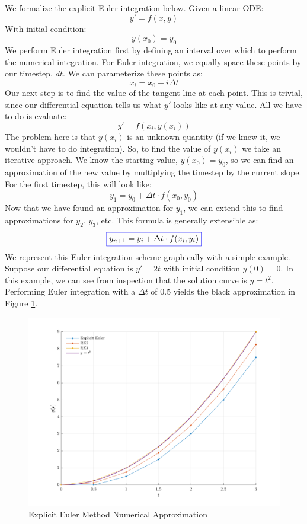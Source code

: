 \documentclass[12pt]{report}
\begin{document}
We formalize the explicit Euler integration below. Given a linear ODE:
$$y'=f\left(x,y\right)$$
With initial condition:
$$y(x_0)=y_0$$
We perform Euler integration first by defining an interval over which to perform the numerical integration. For Euler integration, we equally space these points by our timestep, $dt$. We can parameterize these points as:
$$x_i=x_0+i\Delta t$$
Our next step is to find the value of the tangent line at each point. This is trivial, since our differential equation tells us what $y'$ looks like at any value. All we have to do is evaluate:
$$y'=f\left(x_i,y(x_i)\right)$$
The problem here is that $y(x_i)$ is an unknown quantity (if we knew it, we wouldn’t have to do integration). So, to find the value of $y(x_i)$ we take an iterative approach. We know the starting value, $y(x_0)=y_0$, so we can find an approximation of the new value by multiplying the timestep by the current slope. For the first timestep, this will look like:
$$y_1=y_0+\Delta t\cdot f(x_0,y_0)$$
Now that we have found an approximation for $y_1$, we can extend this to find approximations for $y_2$, $y_3$, etc. This formula is generally extensible as:
$$\color{blue}\boxed{\color{black}y_{n+1}=y_i+\Delta t \cdot f(x_i,y_i)}$$
We represent this Euler integration scheme graphically with a simple example. Suppose our differential equation is $y'=2t$ with initial condition $y(0)=0$. In this example, we can see from inspection that the solution curve is $y=t^2$. Performing Euler integration with a $\Delta t$ of 0.5 yields the black approximation in Figure \ref{fig:Euler}.
\begin{figure}[ht]
    \centering
    
\includegraphics[width=\linewidth]{6DoF Explanation Scripts/Explicit Euler Approximation Figure.png}
    \caption{Explicit Euler Method Numerical Approximation}
    \label{fig:Euler}
\end{figure}
\end{document}
